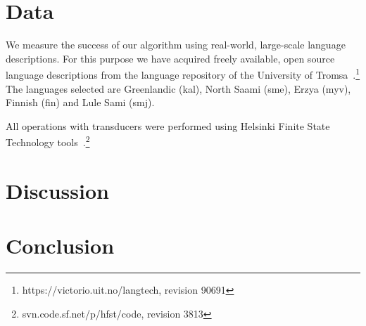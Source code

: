 \documentclass[11pt]{article}
\begin{document}

\section{Data}
\label{sec:data}

We measure the success of our algorithm using real-world, large-scale
language descriptions. For this purpose we have acquired freely
available, open source language descriptions from the language repository of the University of 
Tromsa~\cite{moshagen2013building}.\footnote{https://victorio.uit.no/langtech, revision 90691} The
languages selected are Greenlandic (kal), North Saami (sme), Erzya
(myv), Finnish (fin) and Lule Sami (smj).

All operations with transducers were performed using Helsinki Finite
State Technology tools~\cite{linden2011}.\footnote{svn.code.sf.net/p/hfst/code, revision 3813}



\section{Discussion}
\label{sec:discussion}





\section{Conclusion}
\label{sec:conclusion}

\end{document}
